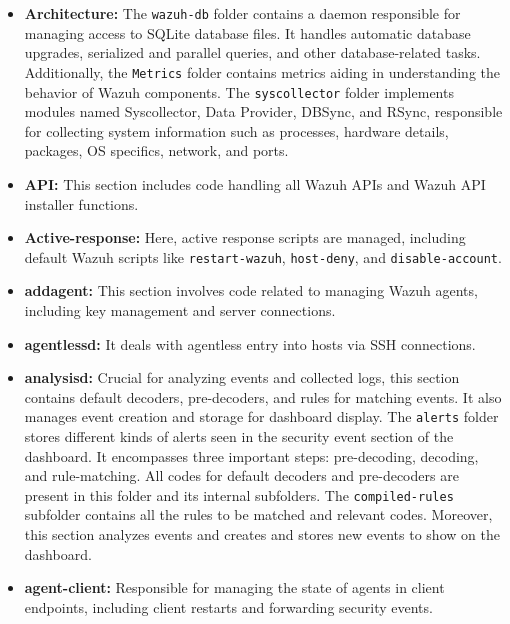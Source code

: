\begin{itemize}
    \item \textbf{Architecture:} The \texttt{wazuh-db} folder contains a daemon responsible for managing access to SQLite database files. It handles automatic database upgrades, serialized and parallel queries, and other database-related tasks. Additionally, the \texttt{Metrics} folder contains metrics aiding in understanding the behavior of Wazuh components. The \texttt{syscollector} folder implements modules named Syscollector, Data Provider, DBSync, and RSync, responsible for collecting system information such as processes, hardware details, packages, OS specifics, network, and ports.
    
    \item \textbf{API:} This section includes code handling all Wazuh APIs and Wazuh API installer functions.
    
    \item \textbf{Active-response:} Here, active response scripts are managed, including default Wazuh scripts like \texttt{restart-wazuh}, \texttt{host-deny}, and \texttt{disable-account}.
    
    \item \textbf{addagent:} This section involves code related to managing Wazuh agents, including key management and server connections.
    
    \item \textbf{agentlessd:} It deals with agentless entry into hosts via SSH connections.
    
    \item \textbf{analysisd:} Crucial for analyzing events and collected logs, this section contains default decoders, pre-decoders, and rules for matching events. It also manages event creation and storage for dashboard display. The \texttt{alerts} folder stores different kinds of alerts seen in the security event section of the dashboard. It encompasses three important steps: pre-decoding, decoding, and rule-matching. All codes for default decoders and pre-decoders are present in this folder and its internal subfolders. The \texttt{compiled-rules} subfolder contains all the rules to be matched and relevant codes. Moreover, this section analyzes events and creates and stores new events to show on the dashboard.
    
    \item \textbf{agent-client:} Responsible for managing the state of agents in client endpoints, including client restarts and forwarding security events.
    

\end{itemize}

